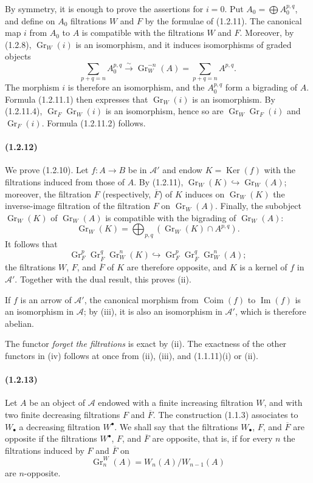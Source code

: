\documentclass[10pt]{article}
\newcommand{\Gr}{\operatorname{Gr}}
\newcommand{\Ker}{\operatorname{Ker}}
\newcommand{\Coim}{\operatorname{Coim}}
\newcommand{\Imop}{\operatorname{Im}}
\newcommand{\calA}{\mathcal A}
\newcommand{\iso}{\xrightarrow{\sim}}
\begin{document}
By symmetry, it is enough to prove the assertions for $i=0$. Put $A_0=\bigoplus A_0^{p,q}$, and define on $A_0$ filtrations $W$ and $F$ by the formulae of (1.2.11). The canonical map $i$ from $A_0$ to $A$ is compatible with the filtrations $W$ and $F$. Moreover, by (1.2.8), $\Gr_W(i)$ is an isomorphism, and it induces isomorphisms of graded objects
\[
\tag{1.2.11.4}
\sum_{p+q=n} A_0^{p,q}\iso \Gr_W^{-n}(A)=\sum_{p+q=n}A^{p,q}.
\]
The morphism $i$ is therefore an isomorphism, and the $A_0^{p,q}$ form a bigrading of $A$. Formula (1.2.11.1) then expresses that $\Gr_W(i)$ is an isomorphism. By (1.2.11.4), $\Gr_F\Gr_W(i)$ is an isomorphism, hence so are $\Gr_W\Gr_F(i)$ and $\Gr_F(i)$. Formula (1.2.11.2) follows.

\paragraph{(1.2.12)} We prove (1.2.10). Let $f:A\to B$ be in $\calA'$ and endow $K=\Ker(f)$ with the filtrations induced from those of $A$. By (1.2.11), $\Gr_W(K)\hookrightarrow\Gr_W(A)$; moreover, the filtration $F$ (respectively, $\overline F$) of $K$ induces on $\Gr_W(K)$ the inverse-image filtration of the filtration $F$ on $\Gr_W(A)$. Finally, the subobject $\Gr_W(K)$ of $\Gr_W(A)$ is compatible with the bigrading of $\Gr_W(A)$:
\[
\Gr_W(K)=\bigoplus_{p,q}(\Gr_W(K)\cap A^{p,q}).
\]
It follows that
\[
\Gr_F^p\Gr_{\overline F}^{q}\Gr_W^n(K)\hookrightarrow \Gr_F^p\Gr_{\overline F}^{q}\Gr_W^n(A);
\]
the filtrations $W$, $F$, and $\overline F$ of $K$ are therefore opposite, and $K$ is a kernel of $f$ in $\calA'$. Together with the dual result, this proves (ii).

If $f$ is an arrow of $\calA'$, the canonical morphism from $\Coim(f)$ to $\Imop(f)$ is an isomorphism in $\calA$; by (iii), it is also an isomorphism in $\calA'$, which is therefore abelian.

The functor \emph{forget the filtrations} is exact by (ii). The exactness of the other functors in (iv) follows at once from (ii), (iii), and (1.1.11)(i) or (ii).

\paragraph{(1.2.13)} Let $A$ be an object of $\calA$ endowed with a finite increasing filtration $W$, and with two finite decreasing filtrations $F$ and $\overline F$. The construction (1.1.3) associates to $W_\bullet$ a decreasing filtration $W^\bullet$. We shall say that the filtrations $W_\bullet$, $F$, and $\overline F$ are opposite if the filtrations $W^\bullet$, $F$, and $\overline F$ are opposite, that is, if for every $n$ the filtrations induced by $F$ and $\overline F$ on
\[
\Gr_n^W(A)=W_n(A)/W_{n-1}(A)
\]
are $n$-opposite.
\end{document}
